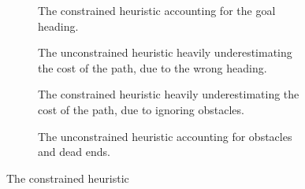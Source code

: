 \begin{figure}[h]
    \centering
    \begin{subfigure}[t]{0.45\textwidth}
        \caption{The constrained heuristic accounting for the goal heading.}
        \label{fig:constrainedGood}
    \end{subfigure}
    \hfill
    \begin{subfigure}[t]{0.45\textwidth}
        \caption{The unconstrained heuristic heavily underestimating the cost of the path, due to the wrong heading.}
        \label{fig:unconstrainedBad}
    \end{subfigure}
        \begin{subfigure}[t]{0.45\textwidth}
        \caption{The constrained heuristic heavily underestimating the cost of the path, due to ignoring obstacles.}
        \label{fig:constrainedBad}
    \end{subfigure}
    \hfill
    \begin{subfigure}[t]{0.45\textwidth}
        \caption{The unconstrained heuristic accounting for obstacles and dead ends.}
        \label{fig:unconstrainedGood}
    \end{subfigure}
    \caption{The constrained heuristic}
    \label{fig:heuristicComparison}
\end{figure}